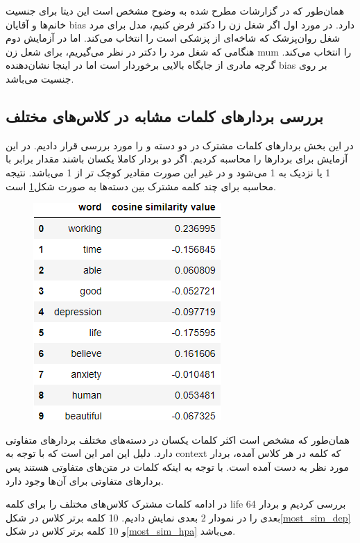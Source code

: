 \documentclass[10pt]{article}
\begin{document}
همان‌طور که در گزارشات مطرح شده به وضوح مشخص است این دیتا برای جنسیت خانم‌ها و آقایان bias دارد. در مورد اول اگر شغل زن را دکتر فرض کنیم، مدل برای مرد شغل روان‌پزشک که شاخه‌ای از پزشکی است را انتخاب می‌کند. اما در آزمایش دوم هنگامی که شغل مرد را دکتر در نظر می‌گیریم، برای شعل زن mum را انتخاب می‌کند. گرچه مادری از جایگاه بالایی برخوردار است اما در اینجا نشان‌دهنده bias بر روی جنسیت می‌باشد.

\subsection{بررسی بردار‌های کلمات مشابه  در کلاس‌های مختلف
}

در این بخش بردار‌های کلمات مشترک در دو دسته
و
 را مورد بررسی قرار دادیم. در این آزمایش برای بردار‌ها 
را محاسبه کردیم. اگر دو بردار کاملا یکسان باشند مقدار
برابر با 1 یا نزدیک به 1 می‌شود و در غیر این صورت مقادیر کوچک تر از 1 می‌باشد. نتیجه محاسبه 
برای چند کلمه مشترک بین دسته‌ها به صورت شکل\ref{cosine_similarity} است.

\begin{figure}[H]
	\centering\includegraphics[width=0.5\linewidth]{../reports/word2vec/cosine_similarity.png}
	\caption{ 
		}
	\label{cosine_similarity}
\end{figure}

همان‌طور که مشخص است اکثر کلمات یکسان در دسته‌های مختلف بردار‌های متفاوتی دارد. دلیل این امر این است که با توجه به context که کلمه در هر کلاس آمده، بردار مورد نظر به دست آمده است. با توجه به اینکه کلمات در متن‌های متفاوتی هستند پس بردار‌های متفاوتی برای آن‌ها وجود دارد.

در ادامه کلمات مشترک کلاس‌های مختلف 
را برای کلمه life بررسی کردیم و بردار 64 بعدی را در نمودار 2 بعدی نمایش دادیم. 10 کلمه برتر کلاس
در شکل\ref{most_sim_dep} و 10 کلمه برتر کلاس
در شکل\ref{most_sim_hpa} می‌باشد.
\end{document}
